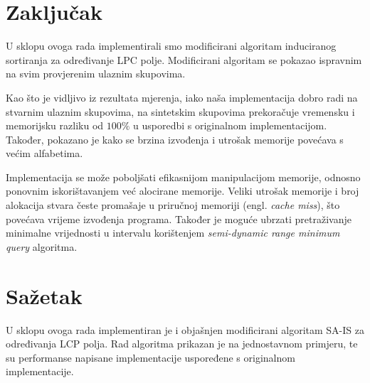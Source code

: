 \documentclass[times, utf8, proizvoljni, numeric]{fer}
\begin{document}
\chapter{Zaključak}

U sklopu ovoga rada implementirali smo modificirani algoritam induciranog sortiranja za određivanje LPC polje.
Modificirani algoritam se pokazao ispravnim na svim provjerenim ulaznim skupovima.

Kao što je vidljivo iz rezultata mjerenja, iako naša implementacija dobro radi na stvarnim ulaznim skupovima, na sintetskim skupovima prekoračuje vremensku i memorijsku razliku od $100\%$ u usporedbi s originalnom implementacijom.
Također, pokazano je kako se brzina izvođenja i utrošak memorije povećava s većim alfabetima.

Implementacija se može poboljšati efikasnijom manipulacijom memorije, odnosno ponovnim iskorištavanjem već alocirane memorije.
Veliki utrošak memorije i broj alokacija stvara česte promašaje u priručnoj memoriji (engl. \textit{cache miss}), što povećava vrijeme izvođenja programa. Također je moguće ubrzati pretraživanje minimalne vrijednosti u intervalu korištenjem \textit{semi-dynamic range minimum query} algoritma.




\chapter{Sažetak}

U sklopu ovoga rada implementiran je i objašnjen modificirani algoritam SA-IS za  određivanja LCP polja.
Rad algoritma prikazan je na jednostavnom primjeru, te su performanse napisane implementacije uspoređene s originalnom implementacije.
\end{document}
